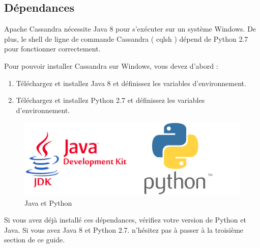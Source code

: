 \subsection{Dépendances}
Apache Cassandra nécessite Java 8 pour s'exécuter sur un système Windows. De plus, le shell de ligne de commande Cassandra ( cqlsh ) dépend de Python 2.7 pour fonctionner correctement.

Pour pouvoir installer Cassandra sur Windows, vous devez d'abord :
\begin{enumerate}
\item Téléchargez et installez Java 8 et définissez les variables d'environnement.
\item Téléchargez et installez Python 2.7 et définissez les variables d'environnement.
\end{enumerate}

\begin{figure}[h]
	\centering
    \includegraphics[scale=0.5]{img/part3/2.1}
    \caption{Java et Python}
\end{figure}

Si vous avez déjà installé ces dépendances, vérifiez votre version de Python et Java. Si vous avez Java 8 et Python 2.7. n'hésitez pas à passer à la troisième section de ce guide.

\newpage

\newpage

\newpage

\newpage

\newpage
